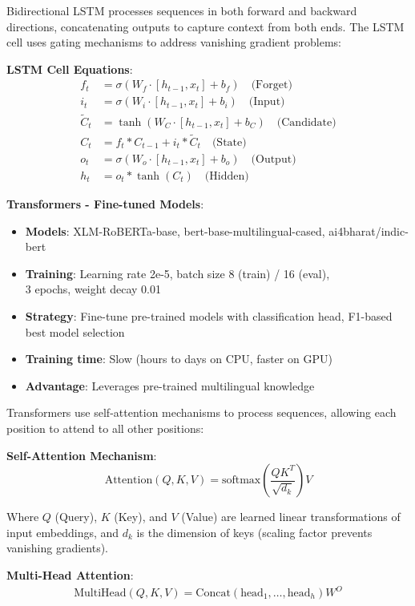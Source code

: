 \documentclass[11pt]{article}
\begin{document}
Bidirectional LSTM processes sequences in both forward and backward directions, concatenating outputs to capture context from both ends. The LSTM cell uses gating mechanisms to address vanishing gradient problems:

\textbf{LSTM Cell Equations}:
\begin{align}
f_t &= \sigma(W_f \cdot [h_{t-1}, x_t] + b_f) \quad \text{(Forget)} \\
i_t &= \sigma(W_i \cdot [h_{t-1}, x_t] + b_i) \quad \text{(Input)} \\
\tilde{C}_t &= \tanh(W_C \cdot [h_{t-1}, x_t] + b_C) \quad \text{(Candidate)} \\
C_t &= f_t * C_{t-1} + i_t * \tilde{C}_t \quad \text{(State)} \\
o_t &= \sigma(W_o \cdot [h_{t-1}, x_t] + b_o) \quad \text{(Output)} \\
h_t &= o_t * \tanh(C_t) \quad \text{(Hidden)}
\end{align}

\textbf{Transformers - Fine-tuned Models}:
\begin{itemize}
\item \textbf{Models}: XLM-RoBERTa-base, bert-base-multilingual-cased, ai4bharat/indic-bert
\item \textbf{Training}: Learning rate 2e-5, batch size 8 (train) / 16 (eval),\\ 3 epochs, weight decay 0.01
\item \textbf{Strategy}: Fine-tune pre-trained models with classification head, F1-based best model selection
\item \textbf{Training time}: Slow (hours to days on CPU, faster on GPU)
\item \textbf{Advantage}: Leverages pre-trained multilingual knowledge
\end{itemize}

Transformers use self-attention mechanisms to process sequences, allowing each position to attend to all other positions:

\textbf{Self-Attention Mechanism}:
\begin{equation}
\text{Attention}(Q,K,V) = \text{softmax}\left(\frac{QK^T}{\sqrt{d_k}}\right)V
\end{equation}

Where $Q$ (Query), $K$ (Key), and $V$ (Value) are learned linear transformations of input embeddings, and $d_k$ is the dimension of keys (scaling factor prevents vanishing gradients).

\textbf{Multi-Head Attention}:
\begin{equation}
\begin{split}
\text{MultiHead}(Q,K,V) = \text{Concat}(\text{head}_1, \ldots, \text{head}_h)W^O
\end{split}
\nonumber
\end{equation}
\end{document}
